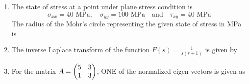 \documentclass[journal,11pt,onecolumn]{IEEEtran}
\begin{document}
\begin{enumerate}[resume]
          \begin{enumerate}
          \end{enumerate}

    \item The state of stress at a point under plane stress condition is
          \[\sigma_{xx} = 40 \text{ MPa}, \quad \sigma_{yy} = 100 \text{ MPa} \quad \text{and} \quad \tau_{xy} = 40 \text{ MPa}\]
          The radius of the Mohr's circle representing the given state of stress in MPa is

          \begin{enumerate}
          \end{enumerate}

    \item The inverse Laplace transform of the function \(F(s) = \frac{1}{s(s+1)}\) is given by

          \begin{enumerate}
          \end{enumerate}

    \item For the matrix \(A = \begin{pmatrix}5 & 3 \\ 1 & 3\end{pmatrix}\), ONE of the normalized eigen vectors is given as


\end{enumerate}
\end{document}
